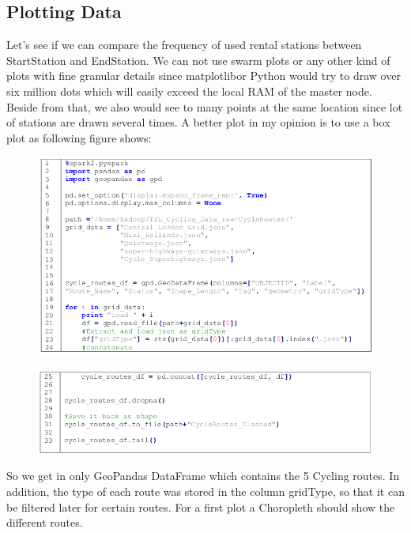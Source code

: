 \subsection{Plotting Data}
Let’s see if we can compare the frequency of used rental stations between StartStation and EndStation.
We can not use swarm plots or any other kind of plots with fine granular details since \glqq matplotlib\grqq or Python would try to draw over six million dots which will easily exceed the local RAM of the master node. Beside from that, we also would see to many points at the same location since lot of stations are drawn several times. A better plot in my opinion is to use a box plot as following figure shows:
\begin{figure}[H]
\hspace{-0.8cm}
\includegraphics[width=1.1\textwidth]{img/spark4}\label{pic:spark4}
\end{figure}
\begin{figure}[H]
\hspace{-0.8cm}
\includegraphics[width=1.1\textwidth]{img/spark5}\label{pic:spark5}
\end{figure}
\noindent So we get in only GeoPandas DataFrame which contains the 5 Cycling routes. In addition, the type of each route was stored in the column \glqq gridType\grqq, so that it can be filtered later for certain routes. For a first plot a Choropleth should show the different routes.
